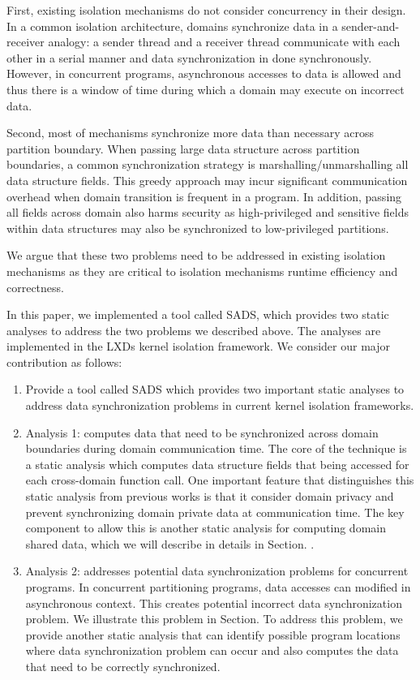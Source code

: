 \documentclass[pageno]{jpaper}
\begin{document}
First, existing isolation mechanisms do not consider concurrency in their design. In a common isolation architecture, domains synchronize data in a sender-and-receiver analogy: a sender thread and a receiver thread communicate with each other in a serial manner and data synchronization in done synchronously. However, in concurrent programs, asynchronous accesses to data is allowed and thus there is a window of time during which a domain may execute on incorrect data. 

Second, most of mechanisms synchronize more data than necessary across partition boundary. When passing large data structure across partition boundaries, a common synchronization strategy is marshalling/unmarshalling all data structure fields. This greedy approach may incur significant communication overhead when domain transition is frequent in a program. In addition, passing all fields across domain also harms security as high-privileged and sensitive fields within data structures may also be synchronized to low-privileged partitions.

We argue that these two problems need to be addressed in existing isolation mechanisms as they are critical to isolation mechanisms runtime efficiency and correctness. 

In this paper, we implemented a tool called SADS, which provides two static analyses to address the two problems we described above. The analyses are implemented in the LXDs kernel isolation framework. We consider our major contribution as follows:

\begin{enumerate}
  \item Provide a tool called SADS which provides two important static analyses to address data synchronization problems in current kernel isolation frameworks.
  \item Analysis 1: computes data that need to be synchronized across domain boundaries during domain communication time. The core of the technique is a static analysis which computes data structure fields that being accessed for each cross-domain function call. One important feature that distinguishes this static analysis from previous works is that it consider domain privacy and prevent synchronizing domain private data at communication time. The key component to allow this is another static analysis for computing domain shared data, which we will describe in details in Section. .
  \item Analysis 2: addresses potential data synchronization problems for concurrent programs. In concurrent partitioning programs, data accesses can modified in asynchronous context. This creates potential incorrect data synchronization problem. We illustrate this problem in Section. To address this problem, we provide another static analysis that can identify possible program locations where data synchronization problem can occur and also computes the data that need to be correctly synchronized.
\end{enumerate}
\end{document}

